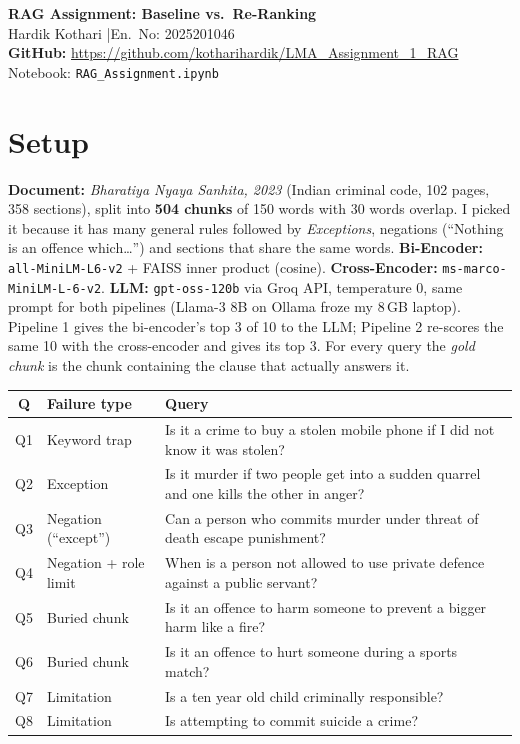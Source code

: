 \documentclass[10pt,a4paper]{article}
\begin{document}
\sloppy

\begin{center}
{\LARGE\bfseries RAG Assignment: Baseline vs.\ Re-Ranking}\\[8pt]
{\large Hardik Kothari \quad|\quad En.\ No: 2025201046}\\[8pt]
\colorbox{yellow!35}{\textbf{GitHub:} \url{https://github.com/kotharihardik/LMA_Assignment_1_RAG}}\\[4pt]
Notebook: \texttt{RAG\_Assignment.ipynb}
\end{center}

\section*{Setup}
\textbf{Document:} \emph{Bharatiya Nyaya Sanhita, 2023} (Indian criminal code, 102 pages, 358 sections), split into \textbf{504 chunks} of 150 words with 30 words overlap.
I picked it because it has many general rules followed by \emph{Exceptions}, negations (``Nothing is an offence which\ldots'') and sections that share the same words.
\textbf{Bi-Encoder:} \texttt{all-MiniLM-L6-v2} + FAISS inner product (cosine).
\textbf{Cross-Encoder:} \texttt{ms-marco-MiniLM-L-6-v2}.
\textbf{LLM:} \texttt{gpt-oss-120b} via Groq API, temperature 0, same prompt for both pipelines (Llama-3 8B on Ollama froze my 8\,GB laptop).
Pipeline 1 gives the bi-encoder's top 3 of 10 to the LLM; Pipeline 2 re-scores the same 10 with the cross-encoder and gives its top 3.
For every query the \emph{gold chunk} is the chunk containing the clause that actually answers it.

\begin{table}[H]\centering\small
{}
\begin{tabular}{@{}cll@{}}
\toprule
\textbf{Q} & \textbf{Failure type} & \textbf{Query}\\
\midrule
Q1 & Keyword trap & Is it a crime to buy a stolen mobile phone if I did not know it was stolen?\\
Q2 & Exception & Is it murder if two people get into a sudden quarrel and one kills the other in anger?\\
Q3 & Negation (``except'') & Can a person who commits murder under threat of death escape punishment?\\
Q4 & Negation + role limit & When is a person not allowed to use private defence against a public servant?\\
Q5 & Buried chunk & Is it an offence to harm someone to prevent a bigger harm like a fire?\\
Q6 & Buried chunk & Is it an offence to hurt someone during a sports match?\\
Q7 & Limitation & Is a ten year old child criminally responsible?\\
Q8 & Limitation & Is attempting to commit suicide a crime?\\
\bottomrule
\end{tabular}
\end{table}
\end{document}
